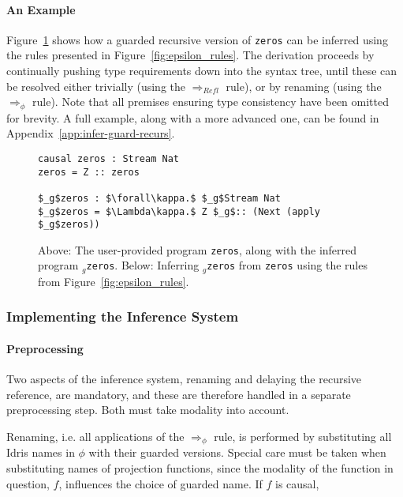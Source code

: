 \paragraph{An Example}

Figure~\ref{fig:epsilon_zeros} shows how a guarded recursive version of
\texttt{zeros} can be inferred using the rules presented in Figure~\ref{fig:epsilon_rules}. The
derivation proceeds by continually pushing type requirements down into the
syntax tree, until these can be resolved either trivially (using the
$\Longrightarrow_{Refl}$ rule), or by renaming (using the
$\Longrightarrow_{\phi}$ rule). Note that all premises ensuring type consistency
have been omitted for brevity. A full example, along with a more advanced one,
can be found in Appendix~\ref{app:infer-guard-recurs}.
\begin{figure}
\begin{lstlisting}[mathescape]
causal zeros : Stream Nat
zeros = Z :: zeros

$_g$zeros : $\forall\kappa.$ $_g$Stream Nat
$_g$zeros = $\Lambda\kappa.$ Z $_g$:: (Next (apply $_g$zeros))
\end{lstlisting}
%
  \caption{Above: The user-provided program \texttt{zeros}, along with the
    inferred program $_g$\texttt{zeros}. Below: Inferring $_g$\texttt{zeros} from \texttt{zeros} using the rules from
  Figure~\ref{fig:epsilon_rules}.}
  \label{fig:epsilon_zeros}
\end{figure}

\subsubsection{Implementing the Inference System}

\paragraph{Preprocessing} Two aspects of the inference system, renaming and
delaying the recursive reference, are mandatory, and these 
are therefore handled in a separate preprocessing step. Both must take modality
into account.

Renaming, i.e. all applications of the $\Longrightarrow_{\phi}$ rule, is
performed by substituting all Idris names in $\phi$ with their guarded
versions. Special care must be taken when substituting names of projection
functions, since the modality of the function in question, $f$, influences the choice
of guarded name. If $f$ is causal, 

